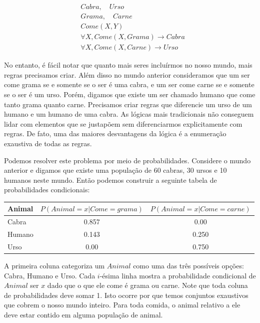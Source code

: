 \documentclass[a4paper,10pt]{article}
\theoremstyle{plain}
\begin{document}
\begin{align*}
  &Cabra, \quad Urso \\
  &Grama, \quad Carne \\
  &Come(X, Y) \\
  &\forall X, Come(X, Grama) \to Cabra \\
  &\forall X, Come(X, Carne) \to Urso
\end{align*}

No entanto, é fácil notar que quanto mais seres incluírmos no nosso mundo, mais regras precisamos
criar. Além disso no mundo anterior consideramos que um ser come grama se e somente se o ser é uma
cabra, e um ser come carne se e somente se o ser é um urso. Porém, digamos que existe um ser
chamado humano que come tanto grama quanto carne. Precisamos criar regras que diferencie um urso de
um humano e um humano de uma cabra. As lógicas mais tradicionais não conseguem lidar com elementos
que se justapõem sem diferenciarmos explicitamente com regras. De fato, uma das maiores
desvantagens da lógica é a enumeração exaustiva de todas as regras.

Podemos resolver este problema por meio de probabilidades. Considere o mundo anterior e digamos que
existe uma população de 60 cabras, 30 ursos e 10 humanos neste mundo. Então podemos construir a
seguinte tabela de probabilidades condicionais:

\begin{table}[h]
  \begin{center}
    \begin{tabular}{l | c  c}
      Animal & $P(Animal=x | Come=grama)$ & $P(Animal=x | Come=carne)$ \\
      \hline
      Cabra & 0.857 & 0.00 \\
      Humano & 0.143 & 0.250 \\
      Urso & 0.00 & 0.750 \\
    \end{tabular}
  \end{center}
\end{table}

A primeira coluna categoriza um $Animal$ como uma das três possíveis opções: Cabra, Humano e Urso.
Cada $i$-ésima linha mostra a probabilidade condicional de $Animal$ ser $x$ dado que o que ele come
é grama ou carne. Note que toda coluna de probabilidades deve somar 1. Isto ocorre por que
temos conjuntos exaustivos que cobrem o nosso mundo inteiro. Para toda comida, o animal relativo
a ele deve estar contido em alguma população de animal.
\end{document}
